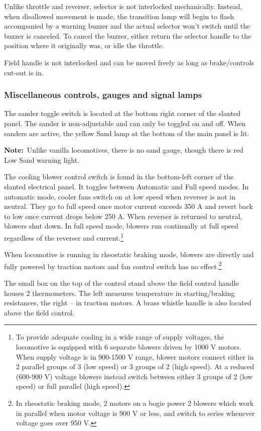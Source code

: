 \documentclass[11pt, a4paper]{article}
\newcommand{\brakemode}[1]{%
    \begingroup
    \setlength{\fboxsep}{0pt}%
    \raisebox{0.1em}{%
        \colorbox{red}{%
            \parbox[c][1.4em][c]{1.4em}{%
                \centering
                \color{black}\bfseries #1%
            }%
        }%
    }%
    \endgroup
}
\newcommand{\note}{\textbf{Note:}}
\begin{document}
Unlike throttle and reverser, selector is not interlocked mechanically. Instead, when disallowed movement is made, the transition lamp will begin to flash accompanied by a warning buzzer and the actual selector won't switch until the buzzer is canceled. To cancel the buzzer, either return the selector handle to the position where it originally was, or idle the throttle.

Field handle is not interlocked and can be moved freely as long as brake/controls cut-out is in.

\subsubsection{Miscellaneous controls, gauges and signal lamps}
The sander toggle switch is located at the bottom right corner of the slanted panel. The sander is non-adjustable and can only be toggled on and off. When sanders are active, the yellow Sand lamp at the bottom of the main panel is lit.

\note\ Unlike vanilla locomotives, there is no sand gauge, though there is red Low Sand warning light.

The cooling blower control switch is found in the bottom-left corner of the slanted electrical panel. It toggles between Automatic and Full speed modes. In automatic mode, cooler fans switch on at low speed when reverser is not in neutral. They go to full speed once motor current exceeds 350 A and revert back to low once current drops below 250 A. When reverser is returned to neutral, blowers shut down. In full speed mode, blowers run continually at full speed regardless of the reverser and current.\footnote{To provide adequate cooling in a wide range of supply voltages, the locomotive is equipped with 6 separate blowers driven by 1000 V motors. When supply voltage is in 900-1500 V range, blower motors connect either in 2 parallel groups of 3 (low speed) or 3 groups of 2 (high speed). At a reduced (600-900 V) voltage blowers instead switch between either 3 groups of 2 (low speed) or full parallel (high speed).}

When locomotive is running in rheostatic braking \brakemode{R} mode, blowers are directly and fully powered by traction motors and fan control switch has no effect.\footnote{In rheostatic braking mode, 2 motors on a bogie power 2 blowers which work in parallel when motor voltage is 900 V or less, and switch to series whenever voltage goes over 950 V.}

The small box on the top of the control stand above the field control handle houses 2 thermometers. The left measures temperature in starting/braking resistances, the right -- in traction motors.
A brass whistle handle is also located above the field control.
\end{document}

